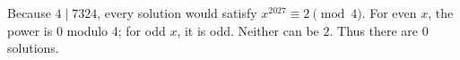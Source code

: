 Because $4\mid7324$, every solution would satisfy $x^{2027}\equiv2\pmod4$. For even $x$, the power is $0$ modulo $4$; for odd $x$, it is odd. Neither can be $2$. Thus there are $\boxed0$ solutions.
